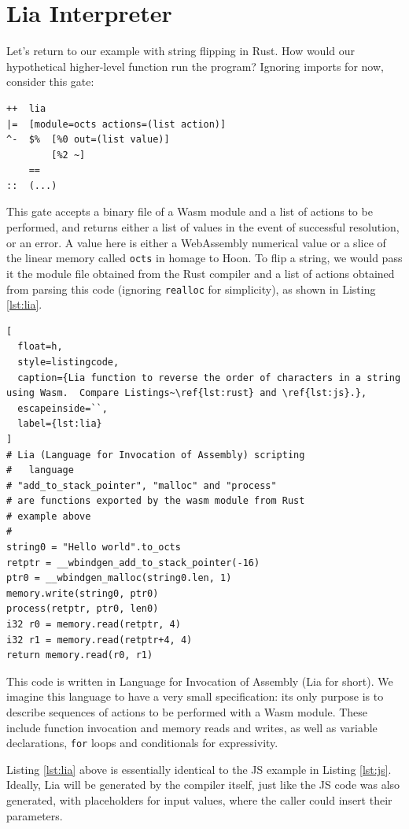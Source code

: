\documentclass[twoside]{article}
\begin{document}
\section{Lia Interpreter}

Let's return to our example with string flipping in Rust. How would our hypothetical higher-level function run the program?  Ignoring imports for now, consider this gate:

\begin{lstlisting}[style=listingcode_rust]
++  lia
|=  [module=octs actions=(list action)]
^-  $%  [%0 out=(list value)]
        [%2 ~]
    ==
::  (...)
\end{lstlisting}

This gate accepts a binary file of a Wasm module and a list of actions to be performed, and returns either a list of values in the event of successful resolution, or an error. A value here is either a WebAssembly numerical value or a slice of the linear memory called \texttt{octs} in homage to Hoon. To flip a string, we would pass it the module file obtained from the Rust compiler and a list of actions obtained from parsing this code (ignoring \texttt{realloc} for simplicity), as shown in Listing \ref{lst:lia}.

\begin{lstlisting}[
  float=h,
  style=listingcode,
  caption={Lia function to reverse the order of characters in a string using Wasm.  Compare Listings~\ref{lst:rust} and \ref{lst:js}.},
  escapeinside=``,
  label={lst:lia}
]
# Lia (Language for Invocation of Assembly) scripting
#   language
# "add_to_stack_pointer", "malloc" and "process"
# are functions exported by the wasm module from Rust
# example above
#
string0 = "Hello world".to_octs
retptr = __wbindgen_add_to_stack_pointer(-16)
ptr0 = __wbindgen_malloc(string0.len, 1)
memory.write(string0, ptr0)
process(retptr, ptr0, len0)
i32 r0 = memory.read(retptr, 4)
i32 r1 = memory.read(retptr+4, 4)
return memory.read(r0, r1)
\end{lstlisting}

This code is written in Language for Invocation of Assembly (Lia for short). We imagine this language to have a very small specification:  its only purpose is to describe sequences of actions to be performed with a Wasm module. These include function invocation and memory reads and writes, as well as variable declarations, \texttt{for} loops and conditionals for expressivity.

Listing \ref{lst:lia} above is essentially identical to the JS example in Listing \ref{lst:js}. Ideally, Lia will be generated by the compiler itself, just like the JS code was also generated, with placeholders for input values, where the caller could insert their parameters.
\end{document}
